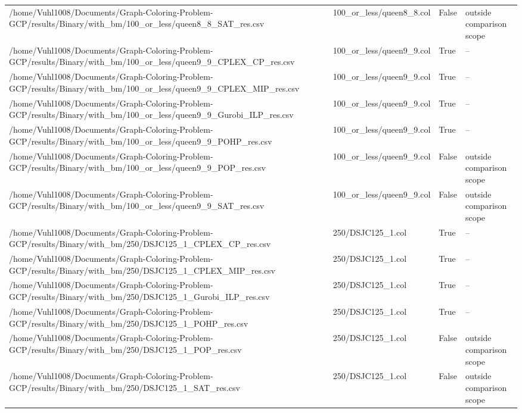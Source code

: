 \begin{table}[htbp]
\begin{tabular}{llll}
/home/Vuhl1008/Documents/Graph-Coloring-Problem-GCP/results/Binary/with\_bm/100\_or\_less/queen8\_8\_SAT\_res.csv & 100\_or\_less/queen8\_8.col & False & outside comparison scope \\
/home/Vuhl1008/Documents/Graph-Coloring-Problem-GCP/results/Binary/with\_bm/100\_or\_less/queen9\_9\_CPLEX\_CP\_res.csv & 100\_or\_less/queen9\_9.col & True & -- \\
/home/Vuhl1008/Documents/Graph-Coloring-Problem-GCP/results/Binary/with\_bm/100\_or\_less/queen9\_9\_CPLEX\_MIP\_res.csv & 100\_or\_less/queen9\_9.col & True & -- \\
/home/Vuhl1008/Documents/Graph-Coloring-Problem-GCP/results/Binary/with\_bm/100\_or\_less/queen9\_9\_Gurobi\_ILP\_res.csv & 100\_or\_less/queen9\_9.col & True & -- \\
/home/Vuhl1008/Documents/Graph-Coloring-Problem-GCP/results/Binary/with\_bm/100\_or\_less/queen9\_9\_POHP\_res.csv & 100\_or\_less/queen9\_9.col & True & -- \\
/home/Vuhl1008/Documents/Graph-Coloring-Problem-GCP/results/Binary/with\_bm/100\_or\_less/queen9\_9\_POP\_res.csv & 100\_or\_less/queen9\_9.col & False & outside comparison scope \\
/home/Vuhl1008/Documents/Graph-Coloring-Problem-GCP/results/Binary/with\_bm/100\_or\_less/queen9\_9\_SAT\_res.csv & 100\_or\_less/queen9\_9.col & False & outside comparison scope \\
/home/Vuhl1008/Documents/Graph-Coloring-Problem-GCP/results/Binary/with\_bm/250/DSJC125\_1\_CPLEX\_CP\_res.csv & 250/DSJC125\_1.col & True & -- \\
/home/Vuhl1008/Documents/Graph-Coloring-Problem-GCP/results/Binary/with\_bm/250/DSJC125\_1\_CPLEX\_MIP\_res.csv & 250/DSJC125\_1.col & True & -- \\
/home/Vuhl1008/Documents/Graph-Coloring-Problem-GCP/results/Binary/with\_bm/250/DSJC125\_1\_Gurobi\_ILP\_res.csv & 250/DSJC125\_1.col & True & -- \\
/home/Vuhl1008/Documents/Graph-Coloring-Problem-GCP/results/Binary/with\_bm/250/DSJC125\_1\_POHP\_res.csv & 250/DSJC125\_1.col & True & -- \\
/home/Vuhl1008/Documents/Graph-Coloring-Problem-GCP/results/Binary/with\_bm/250/DSJC125\_1\_POP\_res.csv & 250/DSJC125\_1.col & False & outside comparison scope \\
/home/Vuhl1008/Documents/Graph-Coloring-Problem-GCP/results/Binary/with\_bm/250/DSJC125\_1\_SAT\_res.csv & 250/DSJC125\_1.col & False & outside comparison scope \\

\end{tabular}
\end{table}
